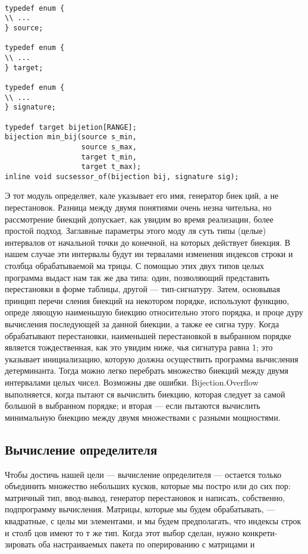 \newpage
\begin{lstlisting}

typedef enum {
\\ ...
} source;

typedef enum {
\\ ...
} target;

typedef enum {
\\ ...
} signature;

typedef target bijetion[RANGE];
bijection min_bij(source s_min,
				  source s_max, 
				  target t_min,
				  target t_max);
inline void sucsessor_of(bijection bij, signature sig);

\end{lstlisting}

Э тот модуль определяет, кале указывает его имя, генератор биек­
ций, а не перестановок. Разница между двумя понятиями очень незна­
чительна, но рассмотрение биекций допускает, как увидим во время
реализации, более простой подход. Заглавные параметры этого моду­
ля суть типы (целые) интервалов от начальной точки до конечной, на
которых действует биекция. В нашем случае эти интервалы будут ин­
тервалами изменения индексов строки и столбца обрабатываемой ма­
трицы. С помощью этих двух типов целых программа выдаст нам так­
же два типа: один, позволяющий представить перестановки в форме
таблицы, другой — тип-сигнатуру. Затем, основывая принцип перечи­
сления биекций на некотором порядке, используют функцию, опреде­
ляющую наименьшую биекцию относительно этого порядка, и проце­
дуру вычисления последующей за данной биекции, а также ее сигна­
туру. Когда обрабатывают перестановки, наименьшей перестановкой
в выбранном порядке является тождественная, как это увидим ниже,
чья сигнатура равна 1; это указывает инициализацию, которую должна
осуществить программа вычисления детерминанта. Тогда можно легко
перебрать множество биекций между двумя интервалами целых чисел.
Возможны две ошибки. Bijection.Overflow выполняется, когда пытают­
ся вычислить биекцию, которая следует за самой большой в выбранном
порядке; и вторая — если пытаются вычислить минимальную биекцию
между двумя множествами с разными мощностями.

\subsection{Вычисление определителя}
Чтобы достичь нашей цели — вычисление определителя — остается
только объединить множество небольших кусков, которые мы постро­
или до сих пор: матричный тип, ввод-вывод, генератор перестановок и
написать, собственно, подпрограмму вычисления.
Матрицы, которые мы будем обрабатывать, — квадратные, с целы­
ми элементами, и мы будем предполагать, что индексы строк и столб­
цов имеют то т же тип. Когда этот выбор сделан, нужно конкрети­
зировать оба настраиваемых пакета по оперированию с матрицами и

